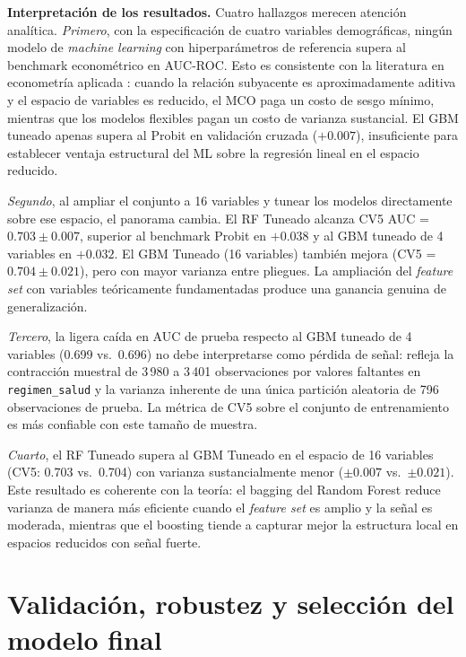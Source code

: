 \documentclass[12pt, a4paper]{article}
\newcommand{\citep}[1]{\cite{#1}}
\begin{document}
\textbf{Interpretación de los resultados.} Cuatro hallazgos merecen atención analítica. \textit{Primero}, con la especificación de cuatro variables demográficas, ningún modelo de \textit{machine learning} con hiperparámetros de referencia supera al benchmark econométrico en AUC-ROC. Esto es consistente con la literatura en econometría aplicada \citep{informal:hastie}: cuando la relación subyacente es aproximadamente aditiva y el espacio de variables es reducido, el MCO paga un costo de sesgo mínimo, mientras que los modelos flexibles pagan un costo de varianza sustancial. El GBM tuneado apenas supera al Probit en validación cruzada ($+0.007$), insuficiente para establecer ventaja estructural del ML sobre la regresión lineal en el espacio reducido.

\textit{Segundo}, al ampliar el conjunto a 16 variables y tunear los modelos directamente sobre ese espacio, el panorama cambia. El RF Tuneado alcanza CV5 AUC = $\mathbf{0.703} \pm 0.007$, superior al benchmark Probit en $+0.038$ y al GBM tuneado de 4 variables en $+0.032$. El GBM Tuneado (16 variables) también mejora (CV5 = $0.704 \pm 0.021$), pero con mayor varianza entre pliegues. La ampliación del \textit{feature set} con variables teóricamente fundamentadas produce una ganancia genuina de generalización.

\textit{Tercero}, la ligera caída en AUC de prueba respecto al GBM tuneado de 4 variables (0.699 vs.\ 0.696) no debe interpretarse como pérdida de señal: refleja la contracción muestral de 3\,980 a 3\,401 observaciones por valores faltantes en \texttt{regimen\_salud} y la varianza inherente de una única partición aleatoria de 796 observaciones de prueba. La métrica de CV5 sobre el conjunto de entrenamiento es más confiable con este tamaño de muestra.

\textit{Cuarto}, el RF Tuneado supera al GBM Tuneado en el espacio de 16 variables (CV5: 0.703 vs.\ 0.704) con varianza sustancialmente menor ($\pm 0.007$ vs.\ $\pm 0.021$). Este resultado es coherente con la teoría: el bagging del Random Forest reduce varianza de manera más eficiente cuando el \textit{feature set} es amplio y la señal es moderada, mientras que el boosting tiende a capturar mejor la estructura local en espacios reducidos con señal fuerte.

\section{Validación, robustez y selección del modelo final}\label{sec:validacion}
\end{document}

